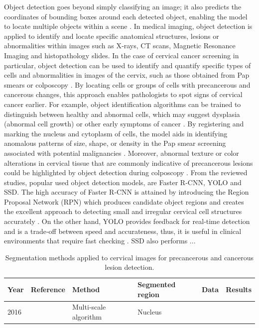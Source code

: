 \documentclass{svjour3}
\begin{document}
Object detection goes beyond simply classifying an image; it also predicts the coordinates of bounding boxes around each detected object, enabling the model to locate multiple objects within a scene \cite{ref80}. In medical imaging, object detection is applied to identify and locate specific anatomical structures, lesions or abnormalities within images such as X‑rays, CT scans, Magnetic Resonance Imaging and histopathology slides. In the case of cervical cancer screening in particular, object detection can be used to identify and quantify specific types of cells and abnormalities in images of the cervix, such as those obtained from Pap smears or colposcopy \cite{ref81}. By locating cells or groups of cells with precancerous and cancerous changes, this approach enables pathologists to spot signs of cervical cancer earlier. For example, object identification algorithms can be trained to distinguish between healthy and abnormal cells, which may suggest dysplasia (abnormal cell growth) or other early symptoms of cancer \cite{ref82}.
By registering and marking the nucleus and cytoplasm of cells, the model aids in identifying anomalous patterns of size, shape, or density in the Pap smear screening associated with potential malignancies \cite{ref83}. Moreover, abnormal texture or color alterations in cervical tissue that are commonly indicative of precancerous lesions could be highlighted by object detection during colposcopy \cite{ref84}.
From the reviewed studies, popular used object detection models, are Faster R‑CNN, YOLO and SSD. The high accuracy of Faster R‑CNN is attained by introducing the Region Proposal Network (RPN) which produces candidate object regions and creates the excellent approach to detecting small and irregular cervical cell structures accurately \cite{ref6,ref88}. On the other hand, YOLO provides feedback for real‑time detection and is a trade‑off between speed and accurateness, thus, it is useful in clinical environments that require fast checking \cite{ref6}. SSD also performs ...
\begin{table}[htbp]
\centering
\caption{Segmentation methods applied to cervical images for precancerous and cancerous lesion detection.}
\label{tab:segmentation_methods}
\begin{tabular}{llllll}
\hline
Year & Reference & Method & Segmented region & Data & Results \\
\hline
2016 & \cite{ref68} & Multi‑scale algorithm & Nucleus & & \\
\hline
\end{tabular}
\end{table}
\end{document}
